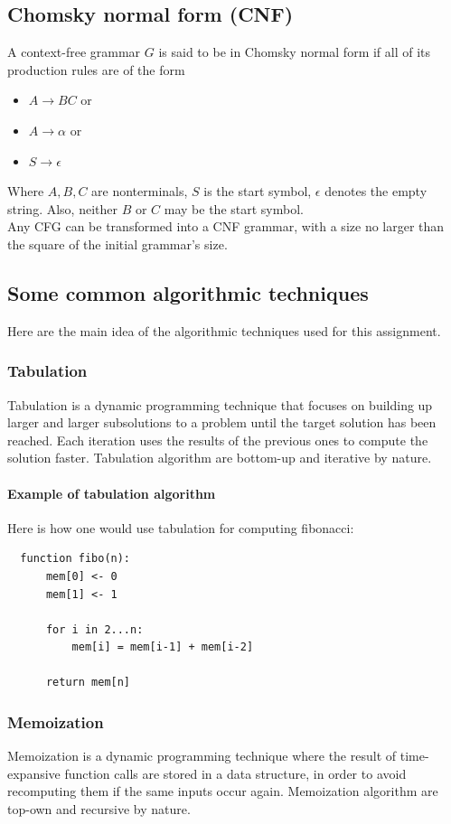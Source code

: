 \documentclass[twocolumn]{article}
\begin{document}
\subsection{Chomsky normal form (CNF)}
A context-free grammar $G$ is said to be in Chomsky normal form if all of its production rules are of the form
\begin{itemize}
\item $A\rightarrow BC$ or
\item $A\rightarrow\alpha$ or
\item $S\rightarrow\epsilon$
\end{itemize}
Where $A,B,C$ are nonterminals, $S$ is the start symbol, $\epsilon$ denotes the empty string. Also, neither $B$ or $C$ may be the start symbol. \\
Any CFG can be transformed into a CNF grammar, with a size no larger than the square of the initial grammar's size.

\subsection{Some common algorithmic techniques}
Here are the main idea of the algorithmic techniques used for this assignment.

\subsubsection{Tabulation}
Tabulation is a dynamic programming technique that focuses on building up larger and larger subsolutions to a problem until the target solution has been reached. Each iteration uses the results of the previous ones to compute the solution faster. Tabulation algorithm are bottom-up and iterative by nature.

\paragraph{Example of tabulation algorithm} Here is how one would use tabulation for computing fibonacci:\\
\begin{lstlisting}
  function fibo(n):
      mem[0] <- 0
      mem[1] <- 1

      for i in 2...n:
          mem[i] = mem[i-1] + mem[i-2]
      
      return mem[n]
\end{lstlisting}

\subsubsection{Memoization}
Memoization is a dynamic programming technique where the result of time-expansive function calls are stored in a data structure, in order to avoid recomputing them if the same inputs occur again. Memoization algorithm are top-own and recursive by nature.
\end{document}
